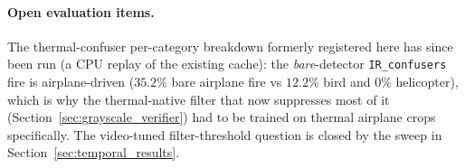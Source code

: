 \paragraph{Open evaluation items.} The thermal-confuser per-category breakdown formerly registered here has since been run (a CPU replay of the existing cache): the \emph{bare}-detector \texttt{IR\_confusers} fire is airplane-driven ($35.2\%$ bare airplane fire vs $12.2\%$ bird and $0\%$ helicopter), which is why the thermal-native filter that now suppresses most of it (Section~\ref{sec:grayscale_verifier}) had to be trained on thermal airplane crops specifically. The video-tuned filter-threshold question is closed by the sweep in Section~\ref{sec:temporal_results}.
